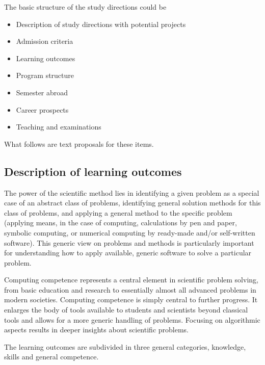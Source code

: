 \documentclass[%
oneside,                 %
final,                   %
10pt]{article}
\begin{document}
The basic structure of the study directions could be

\begin{itemize}
\item Description of study directions with potential projects

\item Admission criteria

\item Learning outcomes

\item Program structure

\item Semester abroad

\item Career prospects

\item Teaching and examinations
\end{itemize}

\noindent
What follows are text proposals for these items.

\subsection{Description of learning outcomes}

The power of the scientific method lies in identifying a given problem
as a special case of an abstract class of problems, identifying
general solution methods for this class of problems, and applying a
general method to the specific problem (applying means, in the case of
computing, calculations by pen and paper, symbolic computing, or
numerical computing by ready-made and/or self-written software). This
generic view on problems and methods is particularly important for
understanding how to apply available, generic software to solve a
particular problem.

Computing competence represents a central element
in scientific problem solving, from basic education and research to
essentially almost all advanced problems in modern
societies. Computing competence is simply central to further
progress. It enlarges the body of tools available to students and
scientists beyond classical tools and allows for a more generic
handling of problems. Focusing on algorithmic aspects results in
deeper insights about scientific problems.

The learning outcomes are subdivided in three general categories, knowledge, skills and general competence.
\end{document}
